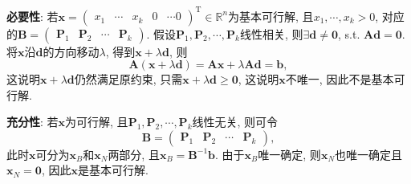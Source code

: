 \textbf{必要性}:
若$\bm{x}=\begin{pmatrix}x_1 & \cdots & x_k & 0 & \cdots 0\end{pmatrix}^\mathrm{T}\in\mathbb{R}^n$为基本可行解, 且$x_1,\cdots,x_k>0$, 对应的$\bm{B}=\begin{pmatrix}\bm{P}_1 & \bm{P}_2 & \cdots & \bm{P}_k\end{pmatrix}$.
假设$\bm{P}_1, \bm{P}_2, \cdots, \bm{P}_k$线性相关, 则$\exists\bm{d}\ne\bm{0}$, s.t. $\bm{Ad}=\bm{0}$.
将$\bm{x}$沿$\bm{d}$的方向移动$\lambda$, 得到$\bm{x}+\lambda\bm{d}$, 则
\begin{equation*}
    \bm{A}(\bm{x}+\lambda\bm{d})=\bm{Ax}+\lambda\bm{Ad}=\bm{b},
\end{equation*}
这说明$\bm{x}+\lambda\bm{d}$仍然满足原约束, 只需$\bm{x}+\lambda\bm{d}\geq\bm{0}$, 这说明$\bm{x}$不唯一, 因此不是基本可行解.


\textbf{充分性}:
若$\bm{x}$为可行解, 且$\bm{P}_1, \bm{P}_2, \cdots, \bm{P}_k$线性无关, 则可令
\begin{equation*}
    \bm{B}
    =
    \begin{pmatrix}
        \bm{P}_1 & \bm{P}_2 & \cdots & \bm{P}_k
    \end{pmatrix},
\end{equation*}
此时$\bm{x}$可分为$\bm{x}_B$和$\bm{x}_N$两部分, 且$\bm{x}_B=\bm{B}^{-1}\bm{b}$.
由于$\bm{x}_B$唯一确定, 则$\bm{x}_N$也唯一确定且$\bm{x}_N=\bm{0}$, 因此$\bm{x}$是基本可行解.
